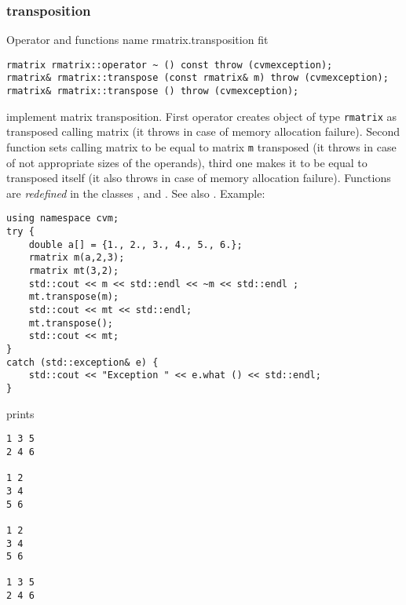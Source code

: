 \subsubsection{transposition}
Operator and functions%
\pdfdest name {rmatrix.transposition} fit
\begin{verbatim}
rmatrix rmatrix::operator ~ () const throw (cvmexception);
rmatrix& rmatrix::transpose (const rmatrix& m) throw (cvmexception);
rmatrix& rmatrix::transpose () throw (cvmexception);
\end{verbatim}
implement matrix transposition.
First operator creates  object of type \verb"rmatrix" as
 transposed calling matrix
(it throws 
in case of memory allocation failure).
Second function sets  calling matrix to be equal to  matrix
\verb"m" transposed
(it throws 
in case of not appropriate sizes of the operands),
third one makes it to be equal to
transposed itself (it also throws 
in case of memory allocation failure).
Functions are \emph{redefined} in the classes
, 
and .
See also .
Example:
\begin{Verbatim}
using namespace cvm;
try {
    double a[] = {1., 2., 3., 4., 5., 6.};
    rmatrix m(a,2,3);
    rmatrix mt(3,2);
    std::cout << m << std::endl << ~m << std::endl ;
    mt.transpose(m);
    std::cout << mt << std::endl;
    mt.transpose();
    std::cout << mt;
}
catch (std::exception& e) {
    std::cout << "Exception " << e.what () << std::endl;
}
\end{Verbatim}
prints
\begin{Verbatim}
1 3 5
2 4 6

1 2
3 4
5 6

1 2
3 4
5 6

1 3 5
2 4 6
\end{Verbatim}
\newpage





